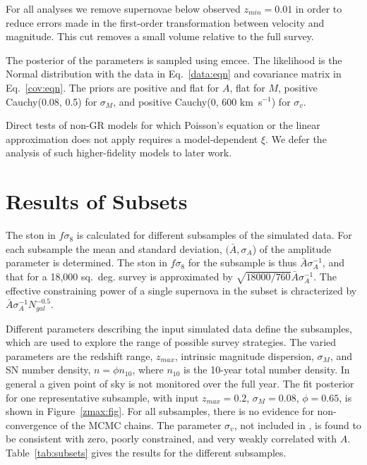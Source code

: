 \documentclass{aastex62}   	%
\begin{document}
For all analyses we remove supernovae below observed $z_{min}=0.01$ in order to
reduce errors made in the first-order transformation between velocity and
magnitude.  This cut removes a  small volume relative to the full survey.

The posterior of the parameters is sampled using emcee.  The likelihood is the Normal distribution with the data in Eq.~\ref{data:eqn} and
covariance matrix in Eq.~\ref{cov:eqn}.
The priors are positive and flat for $A$, flat for $M$, positive Cauchy(0.08, 0.5) for $\sigma_M$, and  positive Cauchy(0, 600 km~s$^{-1}$) for $\sigma_{v}$.

Direct tests of non-GR models for which Poisson's equation or the linear approximation
does not apply requires a model-dependent $\xi$.  We defer the analysis of such higher-fidelity models to later work. 

\section{Results of Subsets}

The  ston in $f\sigma_8$ is calculated for different subsamples of the simulated data.
For each subsample  the mean  and standard deviation, $(\bar{A}, \sigma_A$) of the amplitude parameter is
determined.  The ston in $f\sigma_8$ for the subsample is thus  $\bar{A} \sigma^{-1}_A$, and that for a 18,000 sq.~deg. survey  is approximated by
$\sqrt{18000/760}\bar{A}\sigma^{-1}_A$.  The effective constraining power of a single supernova in the subset is chracterized by 
 $\bar{A} \sigma^{-1}_A N_{gal}^{-0.5}$.

Different parameters describing the input simulated data define the subsamples, 
which are used to explore the range of possible survey strategies.   The varied parameters are the redshift range, $z_{max}$, intrinsic
magnitude dispersion, $\sigma_M$, and SN number density, $n = \phi n_{10}$, where $ n_{10}$ is the  10-year total number density.  In general a given point
of sky is not monitored over the full year.  
The fit posterior for one representative subsample, with input  $z_{max}=0.2$, $\sigma_M=0.08$, $\phi=0.65$, is shown in Figure~\ref{zmax:fig}.
For all subsamples, there is no evidence for non-convergence of the MCMC chains.  The parameter $\sigma_v$, not included in  \citet{2015JCAP...12..033H, 2017JCAP...05..015H},
is found to be consistent with zero, poorly constrained, and very weakly correlated with $A$.  Table~\ref{tab:subsets} gives the results for the different subsamples.
\end{document}
